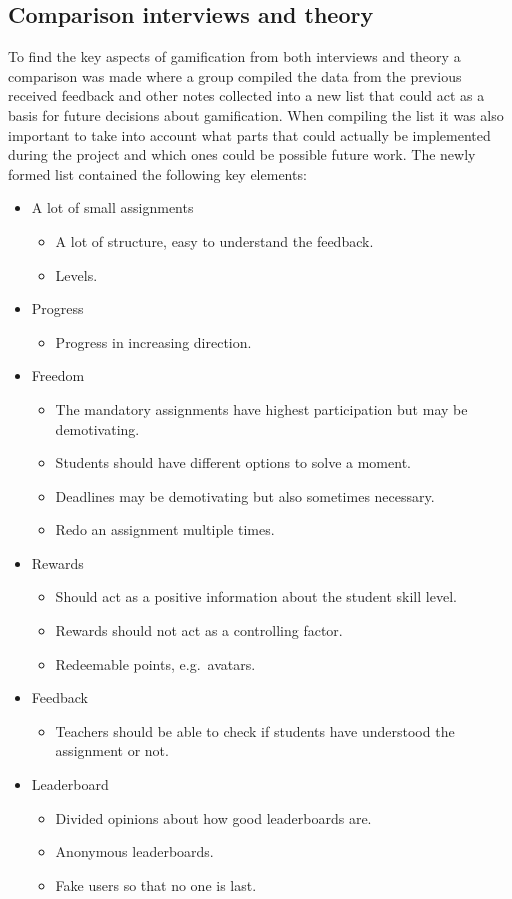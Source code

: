 \documentclass[a4paper,12pt]{article}
\begin{document}
\subsection{Comparison interviews and theory} 
To find the key aspects of gamification from both interviews and theory a comparison was made where a group compiled the data from the previous received feedback and other notes collected into a new list that could act as a basis for future decisions about gamification.
When compiling the list it was also important to take into account what parts that could actually be implemented during the project and which ones could be possible future work.
The newly formed list contained the following key elements:
\begin{itemize}
\item A lot of small assignments
\begin{itemize}
 \item A lot of structure, easy to understand the feedback.
 \item Levels.
\end{itemize}
\item Progress
\begin{itemize}
 \item Progress in increasing direction.
\end{itemize}
\item Freedom
\begin{itemize}
 \item The mandatory assignments have highest participation but may be demotivating.
 \item Students should have different options to solve a moment.
 \item Deadlines may be demotivating but also sometimes necessary.
 \item Redo an assignment multiple times.
\end{itemize}
\item Rewards
\begin{itemize}
 \item Should act as a positive information about the student skill level.
 \item Rewards should not act as a controlling factor.
 \item Redeemable points, e.g.\ avatars.
\end{itemize}
\item Feedback
\begin{itemize}
 \item Teachers should be able to check if students have understood the assignment or not.
\end{itemize}
\item Leaderboard
\begin{itemize}
 \item Divided opinions about how good leaderboards are.
 \item Anonymous leaderboards.
 \item Fake users so that no one is last.
\end{itemize}
\end{itemize}
\end{document}

